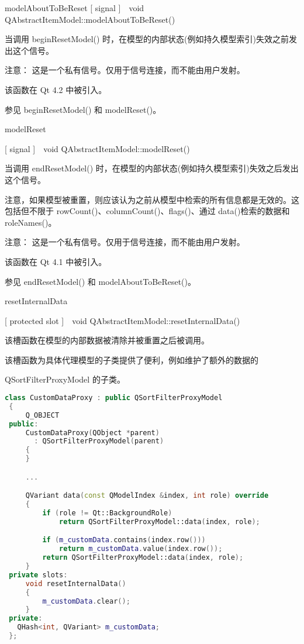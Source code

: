 modelAboutToBeReset
[ signal ] void QAbstractItemModel::modelAboutToBeReset()

当调用 beginResetModel() 时，在模型的内部状态(例如持久模型索引)失效之前发出这个信号。

注意： 这是一个私有信号。仅用于信号连接，而不能由用户发射。

该函数在 Qt 4.2 中被引入。

参见 beginResetModel() 和 modelReset()。

modelReset

[ signal ] void QAbstractItemModel::modelReset()

当调用 endResetModel() 时，在模型的内部状态(例如持久模型索引)失效之后发出这个信号。

注意，如果模型被重置，则应该认为之前从模型中检索的所有信息都是无效的。这包括但不限于 rowCount()、columnCount()、flags()、通过 data()检索的数据和 roleNames()。

注意： 这是一个私有信号。仅用于信号连接，而不能由用户发射。

该函数在 Qt 4.1 中被引入。

参见 endResetModel() 和 modelAboutToBeReset()。

resetInternalData

[ protected slot ] void QAbstractItemModel::resetInternalData()

该槽函数在模型的内部数据被清除并被重置之后被调用。

该槽函数为具体代理模型的子类提供了便利，例如维护了额外的数据的

QSortFilterProxyModel 的子类。

\begin{lstlisting}[language=C++]
 class CustomDataProxy : public QSortFilterProxyModel
 {
     Q_OBJECT
 public:
     CustomDataProxy(QObject *parent)
       : QSortFilterProxyModel(parent)
     {
     }

     ...

     QVariant data(const QModelIndex &index, int role) override
     {
         if (role != Qt::BackgroundRole)
             return QSortFilterProxyModel::data(index, role);

         if (m_customData.contains(index.row()))
             return m_customData.value(index.row());
         return QSortFilterProxyModel::data(index, role);
     }
 private slots:
     void resetInternalData()
     {
         m_customData.clear();
     }
 private:
   QHash<int, QVariant> m_customData;
 };
\end{lstlisting}

